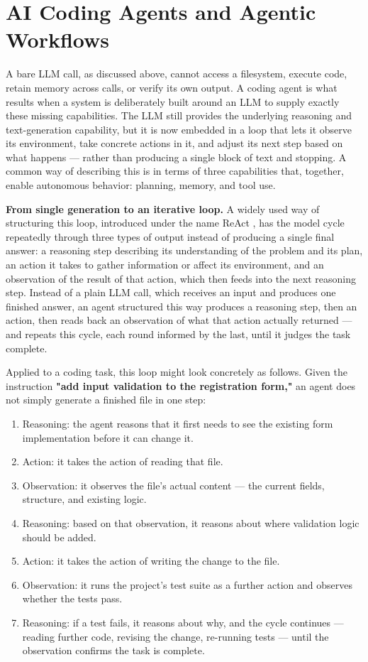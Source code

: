 \section{AI Coding Agents and Agentic Workflows}

A bare LLM call, as discussed above, cannot access a filesystem, execute code, retain memory across calls, or verify its own output. A coding agent is what results when a system is deliberately built around an LLM to supply exactly these missing capabilities. The LLM still provides the underlying reasoning and text-generation capability, but it is now embedded in a loop that lets it observe its environment, take concrete actions in it, and adjust its next step based on what happens --- rather than producing a single block of text and stopping. A common way of describing this is in terms of three capabilities that, together, enable autonomous behavior: planning, memory, and tool use.

\textbf{From single generation to an iterative loop.} A widely used way of structuring this loop, introduced under the name ReAct \cite{yao2023react}, has the model cycle repeatedly through three types of output instead of producing a single final answer: a reasoning step describing its understanding of the problem and its plan, an action it takes to gather information or affect its environment, and an observation of the result of that action, which then feeds into the next reasoning step. Instead of a plain LLM call, which receives an input and produces one finished answer, an agent structured this way produces a reasoning step, then an action, then reads back an observation of what that action actually returned --- and repeats this cycle, each round informed by the last, until it judges the task complete.

Applied to a coding task, this loop might look concretely as follows. Given the instruction \textbf{"add input validation to the registration form,"} an agent does not simply generate a finished file in one step:

\begin{enumerate}[itemsep=2pt, parsep=2pt, topsep=4pt]
    \item Reasoning: the agent reasons that it first needs to see the existing form implementation before it can change it.
    \item Action: it takes the action of reading that file.
    \item Observation: it observes the file's actual content --- the current fields, structure, and existing logic.
    \item Reasoning: based on that observation, it reasons about where validation logic should be added.
    \item Action: it takes the action of writing the change to the file.
    \item Observation: it runs the project's test suite as a further action and observes whether the tests pass.
    \item Reasoning: if a test fails, it reasons about why, and the cycle continues --- reading further code, revising the change, re-running tests --- until the observation confirms the task is complete.
\end{enumerate}

